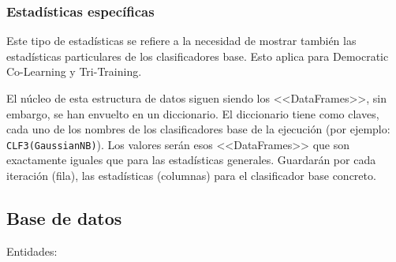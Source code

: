 \subsubsection{Estadísticas específicas}
Este tipo de estadísticas se refiere a la necesidad de mostrar también las
estadísticas particulares de los clasificadores base. Esto aplica para
Democratic Co-Learning y Tri-Training.

El núcleo de esta estructura de datos siguen siendo los <<DataFrames>>, sin
embargo, se han envuelto en un diccionario. El diccionario tiene como claves,
cada uno de los nombres de los clasificadores base de la ejecución (por ejemplo:
\texttt{CLF3(GaussianNB)}). Los valores serán esos <<DataFrames>> que son
exactamente iguales que para las estadísticas generales. Guardarán por cada
iteración (fila), las estadísticas (columnas) para el clasificador base
concreto.

\subsection{Base de datos}

Entidades:

